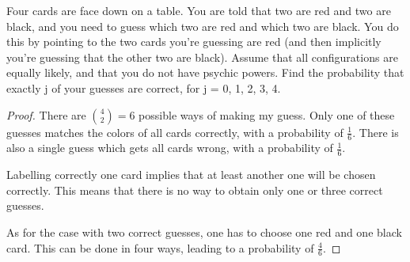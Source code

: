 \begin{exercise}{30}
Four cards are face down on a table. You are told that two are red and two are black, and
you need to guess which two are red and which two are black. You do this by pointing
to the two cards you’re guessing are red (and then implicitly you’re guessing that the
other two are black). Assume that all configurations are equally likely, and that you do
not have psychic powers. Find the probability that exactly j of your guesses are correct,
for j = 0, 1, 2, 3, 4.
\end{exercise}

\begin{proof}
    There are ${4 \choose 2} = 6$ possible ways of making my guess. Only one of these guesses matches the colors of all cards correctly, with a probability of $\frac{1}{6}$. There is also a single guess which gets all cards wrong, with a probability of $\frac{1}{6}$.

    Labelling correctly one card implies that at least another one will be chosen correctly. This means that there is no way to obtain only one or three correct guesses.

    As for the case with two correct guesses, one has to choose one red and one black card. This can be done in four ways, leading to a probability of $\frac{4}{6}$.
    
\end{proof}


